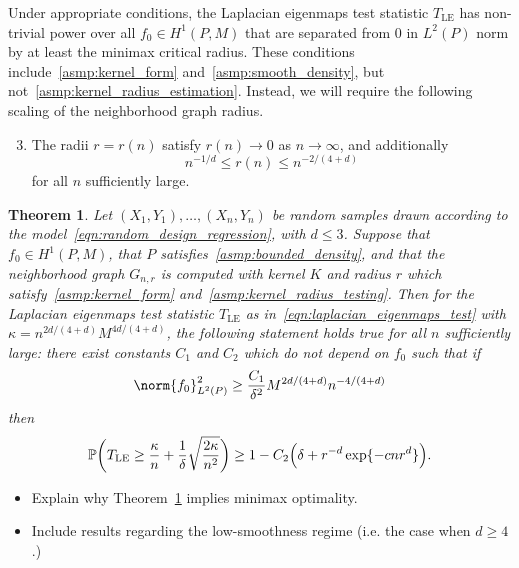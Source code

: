 \documentclass{article}
\newcommand{\1}{\mathbf{1}}
\newcommand{\Leb}{L}
\newcommand{\Pbb}{\mathbb{P}}
\newcommand{\LE}{\mathrm{LE}}
\theoremstyle{alden}
\theoremstyle{aldenthm}
\newtheorem{theorem}{Theorem}
\theoremstyle{definition}
\theoremstyle{remark}
\begin{document}
Under appropriate conditions, the Laplacian eigenmaps test statistic $T_{\LE}$ has non-trivial power over all $f_0 \in H^1(P,M)$ that are separated from $0$ in $\Leb^2(P)$ norm by at least the minimax critical radius. These conditions include~\ref{asmp:kernel_form} and~\ref{asmp:smooth_density}, but not~\ref{asmp:kernel_radius_estimation}. Instead, we will require the following scaling of the neighborhood graph radius.
\begin{enumerate}[label=(K\arabic*)]
	\setcounter{enumi}{2}
	\item 
	\label{asmp:kernel_radius_testing}
	The radii $r = r(n)$ satisfy $r(n) \to 0$ as $n \to \infty$, and additionally
	\begin{equation*}
	n^{-1/d} \leq r(n) \leq n^{-2/(4 + d)}
	\end{equation*}
	for all $n$ sufficiently large.
\end{enumerate}

\begin{theorem}
	\label{thm:laplacian_eigenmaps_testing1}
	Let $(X_1,Y_1),\ldots,(X_n,Y_n)$ be random samples drawn according to the model~\eqref{eqn:random_design_regression}, with $d \leq 3$. Suppose that $f_0 \in H^1(P,M)$, that
	$P$ satisfies~\ref{asmp:bounded_density}, and that the neighborhood graph $G_{n,r}$ is computed with kernel $K$ and radius $r$ which satisfy~\ref{asmp:kernel_form} and~\ref{asmp:kernel_radius_testing}.
	Then for the Laplacian eigenmaps test statistic $T_{\LE}$ as in~\eqref{eqn:laplacian_eigenmaps_test} with $\kappa = n^{2d/(4 + d)} M^{4d/(4 + d)}$, the following statement holds true for all $n$ sufficiently large: there exist constants $C_1$ and $C_2$ which do not depend on $f_0$ such that if
	\begin{equation}
	\label{eqn:laplacian_eigenmaps_testing}
	\norm{f_0}_{\Leb^2(P)}^2 \geq \frac{C_1}{\delta^2} M^{2d/(4 + d)} n^{-4/(4 + d)}
	\end{equation}
	then
	\begin{equation*}
	\Pbb \biggl(T_{\LE} \geq \frac{\kappa}{n} + \frac{1}{\delta}\sqrt{\frac{2\kappa}{n^2}}\biggr) \geq 1 - C_2\Bigl(\delta + r^{-d} \exp\{- c n r^d\}\Bigr).
	\end{equation*}
\end{theorem}
\begin{itemize}
	\item Explain why Theorem~\ref{thm:laplacian_eigenmaps_testing1} implies minimax optimality.
	\item Include results regarding the low-smoothness regime (i.e. the case when $d \geq 4$.)
\end{itemize}
\end{document}
